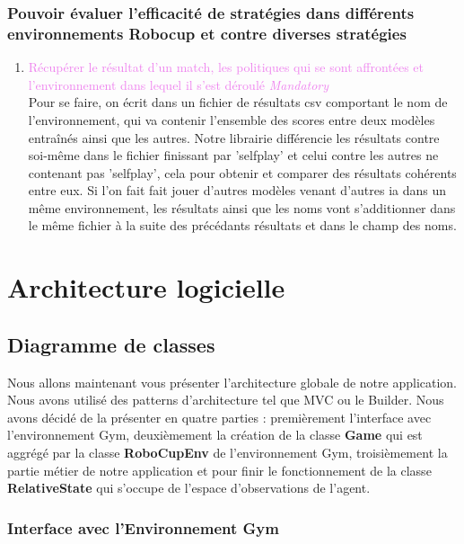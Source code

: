 \documentclass[11pt, a4paper]{article}
\begin{document}
	\subsubsection{Pouvoir évaluer l'efficacité de stratégies dans différents environnements Robocup et contre diverses stratégies }
	\begin{enumerate}
		\item \textcolor{violet}{Récupérer le résultat d'un match, les politiques qui se sont
		affrontées et l'environnement dans lequel il s'est déroulé \textit{Mandatory}}\\
		Pour se faire, on écrit dans un fichier de résultats csv comportant le nom de l'environnement,
		qui va contenir l'ensemble des scores entre deux modèles entraînés ainsi que les autres.
		Notre librairie différencie les résultats contre soi-même dans le fichier finissant par
		'selfplay' et celui contre les autres ne contenant pas 'selfplay', cela pour obtenir et
		comparer des résultats cohérents entre eux. Si l'on fait fait jouer d'autres modèles venant
		d'autres ia dans un même environnement, les résultats ainsi que les noms vont s'additionner
		dans le même fichier à la suite des précédants résultats et dans le champ des noms.

	\end{enumerate}



	\section{Architecture logicielle}

	\subsection{Diagramme de classes}
	Nous allons maintenant vous présenter l'architecture globale de notre application.
	Nous avons utilisé des patterns d'architecture tel que MVC ou le Builder. Nous avons décidé de la présenter en quatre parties :
	premièrement l'interface avec l'environnement Gym, deuxièmement la création de la classe \textbf{Game} qui est aggrégé par la classe \textbf{RoboCupEnv}
	de l'environnement Gym, troisièmement la partie métier de notre application et pour finir le fonctionnement de la classe \textbf{RelativeState} qui s'occupe de l'espace d'observations de l'agent.\\

	\subsubsection{Interface avec l'Environnement Gym}
\end{document}
